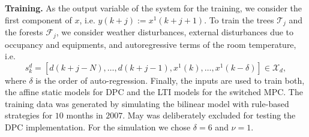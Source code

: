 \documentclass[]{ifacconf}  %
\begin{document}
\textbf{Training.} As the output variable of the system for the training, we consider the first component of $x$, i.e. $y(k+j):=x^1(k+j+1)$.
To train the trees $\mathcal{T}_j$ and the forests $\mathcal{F}_j$, we consider weather disturbances, external disturbances due to occupancy and equipments, and autoregressive terms of the room temperature, i.e.
\small
\begin{equation}
s_k^d = [d(k+j-N),\ldots,d(k+j-1), x^1(k),\ldots, x^1(k-\delta)] \in \mathcal{X}_d,
\end{equation}
\normalsize
where $\delta$ is the order of auto-regression.
Finally, the inputs are used to train both, the affine static models for DPC and the LTI models for the switched MPC.
The training data was generated by simulating the bilinear model with rule-based strategies for $10$ months in $2007$. May was deliberately excluded for testing the DPC implementation.
For the simulation we chose $\delta = 6$ and $\nu = 1$.
\end{document}
